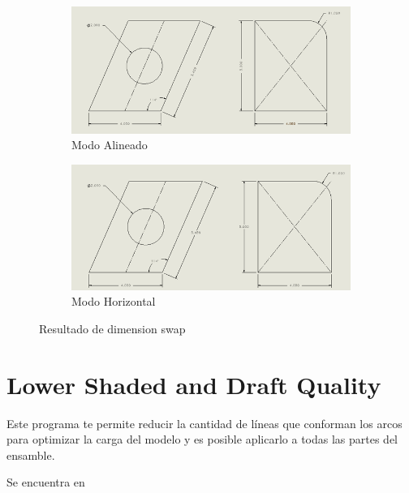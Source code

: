 \documentclass[12pt,letterpaper,final]{report}
\begin{document}
\begin{figure}[H]
	\centering
	\begin{subfigure}[b]{0.45\textwidth}
		\includegraphics[width=\textwidth]{Imagenes/solidworks_macro_12}
		\caption{Modo Alineado}
		\label{fig:solidworksmacro12}
	\end{subfigure}
	\begin{subfigure}[b]{0.45\textwidth}
		\includegraphics[width=\textwidth]{Imagenes/solidworks_macro_13}
		\caption{Modo Horizontal}
		\label{fig:solidworksmacro13}
	\end{subfigure}
	\caption{Resultado de dimension swap}
\end{figure}


\section{Lower Shaded and Draft Quality}

Este programa te permite reducir la cantidad de líneas que conforman los arcos para optimizar la carga del modelo y es posible aplicarlo a todas las partes del ensamble.

Se encuentra en 
\end{document}
